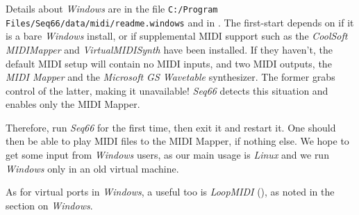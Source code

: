 
   Details about \textsl{Windows} are in the file
   \texttt{C:/Program Files/Seq66/data/midi/readme.windows}
   and in .
   The first-start depends on if it is a bare \textsl{Windows}
   install, or if supplemental MIDI support such as 
   the 
   \textsl{CoolSoft MIDIMapper} and 
   \textsl{VirtualMIDISynth} have been installed.
   If they haven't, the default MIDI setup will contain no MIDI inputs,
   and two MIDI outputs, the \textsl{MIDI Mapper} and the
   \textsl{Microsoft GS Wavetable} synthesizer.
   The former grabs control of the latter, making it unavailable!
   \textsl{Seq66} detects this situation and enables only the MIDI Mapper.

   Therefore, run \textsl{Seq66} for the first time, then exit it and
   restart it. One should then be able to play MIDI files to the MIDI Mapper,
   if nothing else.
   We hope to get some input from
   \textsl{Windows} users, as our main usage is \textsl{Linux}
   and we run \textsl{Windows} only in an old virtual machine.

   As for virtual ports in \textsl{Windows}, a useful too
   is \textsl{LoopMIDI} (\cite{loopmidi}), as noted in the section
   on \textsl{Windows}.

